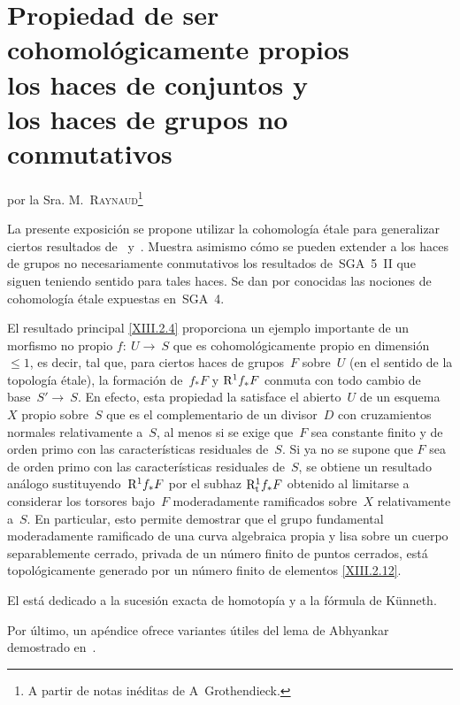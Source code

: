 
\chapter[Propiedad de ser cohomológicamente propios los haces...]{Propiedad de ser cohomológicamente propios\\ los haces de conjuntos y\\ los haces de grupos no conmutativos}
\label{XIII}

\begin{center}
{por la Sra. M.\ \textsc{Raynaud}\footnote{A partir de notas inéditas de
A\ptbl\ Grothendieck.}}
\end{center}
\vspace*{1cm}

La presente exposición se propone utilizar la cohomología étale para
generalizar ciertos resultados de~ y~. Muestra asimismo cómo
se pueden extender a los haces de grupos no necesariamente conmutativos los
resultados de~SGA~5~II que siguen teniendo sentido para tales haces. Se dan
por conocidas las nociones de cohomología étale expuestas en~SGA~4.

El resultado principal \eqref{XIII.2.4} proporciona un ejemplo importante de
un morfismo no propio $f\colon~U\to~S$ que es \og cohomológicamente propio en
dimensión~$\leq1$\fg, es decir, tal que, para ciertos haces de grupos~$F$
sobre~$U$ (en el sentido de la topología étale), la formación de~$f_*F$ y
$\mathrm{R}^1f_*F$ conmuta con todo cambio de base~$S'\to~S$. En efecto, esta
propiedad la satisface el abierto~$U$ de un esquema~$X$ propio sobre~$S$ que
es el complementario de un divisor~$D$ con cruzamientos normales
relativamente a~$S$, al menos si se exige que~$F$ sea constante finito y de
orden primo con las características residuales de~$S$. Si ya no se supone que
$F$ sea de orden primo con las características residuales de~$S$, se obtiene
un resultado análogo sustituyendo~$\mathrm{R}^1f_*F$ por el subhaz
$\mathrm{R}^1_{\mathrm{t}}f_*F$ obtenido al limitarse a considerar los torsores bajo~$F$
\og moderadamente ramificados sobre~$X$ relativamente a~$S$\fg. En
particular, esto permite demostrar que el grupo fundamental moderadamente
ramificado de una curva algebraica propia y lisa sobre un cuerpo
separablemente cerrado, privada de un número finito de puntos cerrados, está
topológicamente generado por un número finito de elementos
\eqref{XIII.2.12}.

El
\No {} está dedicado a la sucesión exacta de homotopía y a la
fórmula de Künneth.

Por último, un apéndice ofrece variantes útiles del lema de Abhyankar
demostrado en~.

\setcounter{section}{-1}
